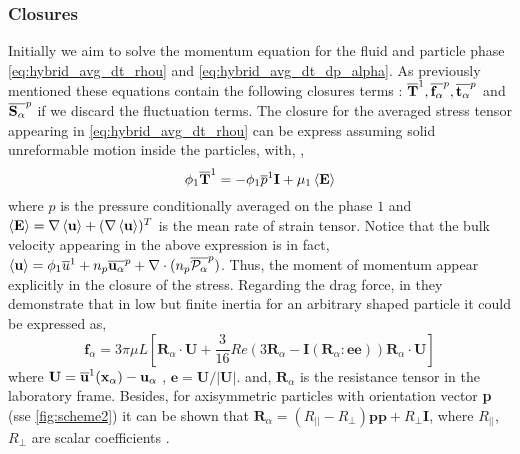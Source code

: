 \subsubsection*{Closures}
Initially we aim to solve the momentum equation for the fluid and particle phase \ref{eq:hybrid_avg_dt_rhou} and \ref{eq:hybrid_avg_dt_dp_alpha}. 
As previously mentioned these equations contain the following closures terms : $\overline{\textbf{T}}^1, \overline{\textbf{f}_\alpha}^{p}, \overline{\textbf{t}_\alpha}^{p}$ and $\overline{\textbf{S}_\alpha}^{p}$ if we discard the fluctuation terms.
The closure for the averaged stress tensor appearing in \ref{eq:hybrid_avg_dt_rhou} can be express assuming solid unreformable motion inside the particles, with, \citep{jackson1997locally},
\begin{equation*}
    \phi_1\overline{\textbf{T}}^1
    =  - \phi_1\overline{p}^1\textbf{I}
    + \mu_1 \left<\textbf{E}\right>
\end{equation*}
where $p$ is the pressure conditionally averaged on the phase $1$ and $\left<\textbf{E}\right> = \mathbf{\nabla} \left<\textbf{u}\right> + (\mathbf{\nabla} \left<\textbf{u}\right>)^T$ is the mean rate of strain tensor. 
Notice that the bulk velocity appearing in the above expression is in fact, $\left<\textbf{u}\right> = \phi_1\overline{u}^1 + n_p\overline{\textbf{u}_\alpha}^{p} + \mathbf{\nabla}\cdot (n_p\overline{\mathcal{P}_\alpha}^{p})$.
Thus, the moment of momentum appear explicitly in the closure of the stress. 
Regarding the drag force, in  \citet{brenner1963resistance} they demonstrate that in low but finite inertia for an arbitrary shaped particle it could be expressed as,
\begin{equation}
    \textbf{f}_\alpha = 3 \pi \mu L \left[
        \textbf{R}_\alpha \cdot \textbf{U}
        + \frac{3}{16} Re  \left(
            3 \textbf{R}_\alpha 
            - \textbf{I} (\textbf{R}_\alpha : \textbf{e} \textbf{e})
        \right)
        \textbf{R}_\alpha\cdot  \textbf{U}
    \right]
\end{equation}
where $\textbf{U} = \overline{\textbf{u}}^1(\textbf{x}_\alpha)  - \textbf{u}_\alpha$ , $\textbf{e} = \textbf{U}/|\textbf{U}|$. 
and,  $\textbf{R}_\alpha$ is the resistance tensor in the laboratory frame. 
Besides, for axisymmetric particles with orientation vector \textbf{p} (sse \ref{fig:scheme2}) it can be shown that $\textbf{R}_\alpha = (R_{||} - R_\bot) \textbf{pp} + R_\bot \textbf{I}$, where $R_{||}$, $R_\bot$ are scalar coefficients \citep{guazzelli2011,kim2013microhydrodynamics}. 
